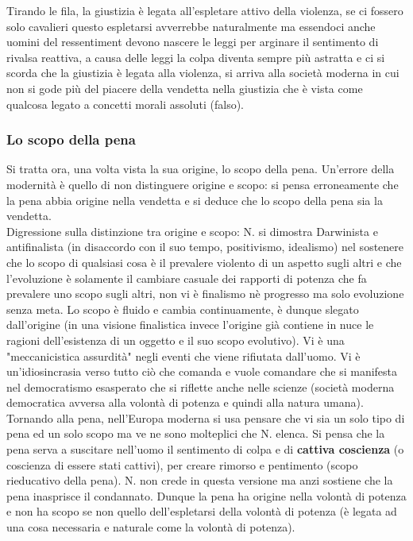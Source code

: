 \documentclass[10pt,a4paper]{article}
\begin{document}
Tirando le fila, la giustizia è legata all'espletare attivo della violenza, se ci fossero solo cavalieri questo espletarsi avverrebbe naturalmente ma essendoci anche uomini del ressentiment devono nascere le leggi per arginare il sentimento di rivalsa reattiva, a causa delle leggi la colpa diventa sempre più astratta e ci si scorda che la giustizia è legata alla violenza, si arriva alla società moderna in cui non si gode più del piacere della vendetta nella giustizia che è vista come qualcosa legato a concetti morali assoluti (falso). 
\subsubsection{Lo scopo della pena}
Si tratta ora, una volta vista la sua origine, lo scopo della pena. Un'errore della modernità è quello di non distinguere origine e scopo: si pensa erroneamente che la pena abbia origine nella vendetta e si deduce che lo scopo della pena sia la vendetta.\\
Digressione sulla distinzione tra origine e scopo: N. si dimostra Darwinista e antifinalista (in disaccordo con il suo tempo, positivismo, idealismo) nel sostenere che lo scopo di qualsiasi cosa è il prevalere violento di un aspetto sugli altri e che l'evoluzione è solamente il cambiare casuale dei rapporti di potenza che fa prevalere uno scopo sugli altri, non vi è finalismo nè progresso ma solo evoluzione senza meta. Lo scopo è fluido e cambia continuamente, è dunque slegato dall'origine (in una visione finalistica invece l'origine già contiene in nuce le ragioni dell'esistenza di un oggetto e il suo scopo evolutivo). Vi è una "meccanicistica assurdità" negli eventi che viene rifiutata dall'uomo. Vi è un'idiosincrasia verso tutto ciò che comanda e vuole comandare che si manifesta nel democratismo esasperato che si riflette anche nelle scienze (società moderna democratica avversa alla volontà di potenza e quindi alla natura umana). \\
Tornando alla pena, nell'Europa moderna si usa pensare che vi sia un solo tipo di pena ed un solo scopo ma ve ne sono molteplici che N. elenca. Si pensa che la pena serva a suscitare nell'uomo il sentimento di colpa e di \textbf{cattiva coscienza} (o coscienza di essere stati cattivi), per creare rimorso e pentimento (scopo rieducativo della pena). N. non crede in questa versione ma anzi sostiene che la pena inasprisce il condannato. Dunque la pena ha origine nella volontà di potenza e non ha scopo se non quello dell'espletarsi della volontà di potenza (è legata ad una cosa necessaria e naturale come la volontà di potenza).
\end{document}
